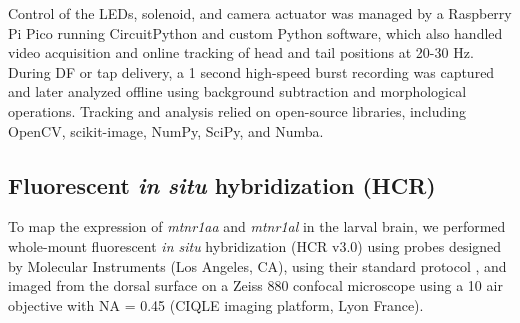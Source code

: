 \documentclass[9.5pt]{RandlettLab_elife}            %
\begin{document}
Control of the LEDs, solenoid, and camera actuator was managed by a Raspberry Pi Pico running CircuitPython and custom Python software, which also handled video acquisition and online tracking of head and tail positions at 20-30 Hz.
During DF or tap delivery, a 1 second high-speed burst recording was captured and later analyzed offline using background subtraction and morphological operations.
Tracking and analysis relied on open-source libraries, including OpenCV, scikit-image, NumPy, SciPy, and Numba.

\subsection{Fluorescent \emph{in situ} hybridization (HCR)}
To map the expression of \emph{mtnr1aa} and \emph{mtnr1al} in the larval brain, we performed whole-mount fluorescent \emph{in situ} hybridization (HCR v3.0) using probes designed by Molecular Instruments (Los Angeles, CA), using their standard protocol \citep{Choi2018}, and imaged from the dorsal surface on a Zeiss 880 confocal microscope using a 10\texttimes{} air objective with NA = 0.45 (CIQLE imaging platform, Lyon France).
\end{document}
